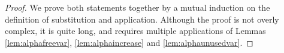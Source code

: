 \documentclass{lmcs}
\theoremstyle{theorem}\newtheorem{theorem}[dummy]{Theorem}
\theoremstyle{theorem}\newtheorem{lemma}[dummy]{Lemma}
\theoremstyle{theorem}\newtheorem{corollary}[dummy]{Corollary}
\theoremstyle{definition}\newtheorem{definition}[dummy]{Definition}
\theoremstyle{definition}\newtheorem{example}[dummy]{Example}
\newcommand{\FV}{\mathit{FV}}
\newcommand{\domain}{\mathtt{dom}}
\newcommand{\identifier}[1]{\mathtt{#1}}
\newcommand{\afun}{\identifier{f}}
\newcommand{\abs}[2]{\lambda #1.#2}
\begin{document}
\begin{proof}
We prove both statements together by a mutual induction on the definition of substitution and application.
Although the proof is not overly complex, it is quite long, and requires multiple applications
of Lemmas \ref{lem:alphafreevar}, \ref{lem:alphaincrease} and \ref{lem:alphaunusedvar}.

\end{proof}
\end{document}
